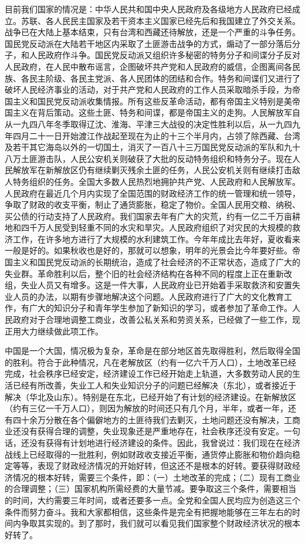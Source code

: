 目前我们国家的情况是：中华人民共和国中央人民政府及各级地方人民政府已经成立。苏联、各人民民主国家及若干资本主义国家已经先后和我国建立了外交关系。战争已在大陆上基本结束，只有台湾和西藏还待解放，还是一个严重的斗争任务。国民党反动派在大陆若干地区内采取了土匪游击战争的方式，煽动了一部分落后分子，和人民政府作斗争。国民党反动派又组织许多秘密的特务分子和间谍分子反对人民政府，在人民中散布谣言，企图破坏共产党和人民政府的威信，企图离间各民族、各民主阶级、各民主党派、各人民团体的团结和合作。特务和间谍们又进行了破坏人民经济事业的活动，对于共产党和人民政府的工作人员采取暗杀手段，为帝国主义和国民党反动派收集情报。所有这些反革命活动，都有帝国主义特别是美帝国主义在背后策动。这些土匪、特务和间谍，都是帝国主义的走狗。人民解放军自从一九四八年冬季取得辽沈、淮海、平津三大战役的决定性胜利以后，从一九四九年四月二十一日开始渡江作战起至现在为止的十三个半月内，占领了除西藏、台湾及若干其它海岛以外的一切国土，消灭了一百八十三万国民党反动派的军队和九十八万土匪游击队，人民公安机关则破获了大批的反动特务组织和特务分子。现在人民解放军在新解放区仍有继续剿灭残余土匪的任务，人民公安机关则有继续打击敌人特务组织的任务。全国大多数人民热烈地拥护共产党、人民政府和人民解放军。人民政府在最近几个月内实现了全国范围的财政经济工作的统一管理和统一领导，争取了财政的收支平衡，制止了通货膨胀，稳定了物价。全国人民用交粮、纳税、买公债的行动支持了人民政府。我们国家去年有广大的灾荒，约有一亿二千万亩耕地和四千万人民受到轻重不同的水灾和旱灾。人民政府组织了对灾民的大规模的救济工作，在许多地方进行了大规模的水利建筑工作。今年年成比去年好，夏收看来一般是好的。如果秋收也是好的，那就可以想象，明年的光景会比今年要好些。帝国主义和国民党反动派的长期统治，造成了社会经济的不正常状态，造成了广大的失业群。革命胜利以后，整个旧的社会经济结构在各种不同的程度上正在重新改组，失业人员又有增多。这是一件大事，人民政府业已开始着手采取救济和安置失业人员的办法，以期有步骤地解决这个问题。人民政府进行了广大的文化教育工作，有广大的知识分子和青年学生参加了新知识的学习，或者参加了革命工作。人民政府对于合理地调整工商业，改善公私关系和劳资关系，已经做了一些工作，现正用大力继续做此项工作。

中国是一个大国，情况极为复杂，革命是在部分地区首先取得胜利，然后取得全国的胜利。符合于此种情况，凡在老解放区（约有一亿六千万人口），土地改革已经完成，社会秩序已经安定，经济建设工作已经开始走上轨道，大多数劳动人民的生活已经有所改善，失业工人和失业知识分子的问题已经解决（东北），或者接近于解决（华北及山东）。特别是在东北，已经开始了有计划的经济建设。在新解放区（约有三亿一千万人口），则因为解放的时间还只有几个月，半年，或者一年，还有四十余万分散在各个偏僻地方的土匪待我们去剿灭，土地问题还没有解决，工商业还没有获得合理的调整，失业现象还是严重地存在，社会秩序还没有安定。一句话，还没有获得有计划地进行经济建设的条件。因此，我曾说过：我们现在在经济战线上已经取得的一批胜利，例如财政收支接近平衡，通货停止膨胀和物价趋向稳定等等，表现了财政经济情况的开始好转，但这还不是根本的好转。要获得财政经济情况的根本好转，需要三个条件，即：（一）土地改革的完成；（二）现有工商业的合理调整；（三）国家机构所需经费的大量节减。要争取这三个条件，需要相当的时间，大约需要三年时间，或者还要多一点。全党和全国人民均应为创造这三个条件而努力奋斗。我和大家都相信，这些条件是完全有把握地能够在三年左右的时间内争取其实现的。到了那时，我们就可以看见我们国家整个财政经济状况的根本好转了。

